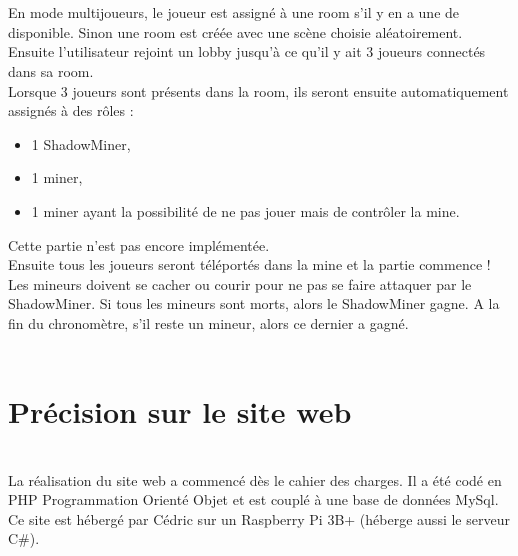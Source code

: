 \documentclass[titlepage, 13px, a4paper]{report}
\begin{document}
\paragraph{} \hspace{0pt} \\
En mode multijoueurs, le joueur est assigné à une room s’il y en a une de disponible.
Sinon une room est créée avec une scène choisie aléatoirement. \\

Ensuite l’utilisateur rejoint un lobby jusqu’à ce qu’il y ait 3 joueurs connectés dans sa room. \\

Lorsque 3 joueurs sont présents dans la room, ils seront ensuite automatiquement assignés à des rôles : \\ 
{\begin{itemize}
	\item 1 ShadowMiner, 
	\item 1 miner,
	\item 1 miner ayant la possibilité de ne pas jouer mais de contrôler la mine. \\ 
\end{itemize}} 

Cette partie n’est pas encore implémentée. \\

Ensuite tous les joueurs seront téléportés dans la mine et la partie commence ! \\
Les mineurs doivent se cacher ou courir pour ne pas se faire attaquer par le ShadowMiner.
Si tous les mineurs sont morts, alors le ShadowMiner gagne.
A la fin du chronomètre, s’il reste un mineur, alors ce dernier a gagné. \\ \\


\section{Précision sur le site web}
\paragraph{} \hspace{0pt} \\
La réalisation du site web a commencé dès le cahier des charges. Il a été codé en PHP Programmation Orienté Objet et 
est couplé à une base de données MySql. \\
Ce site est hébergé par Cédric sur un Raspberry Pi 3B+ (héberge aussi le serveur C\#). \\ \\ %
\end{document}
